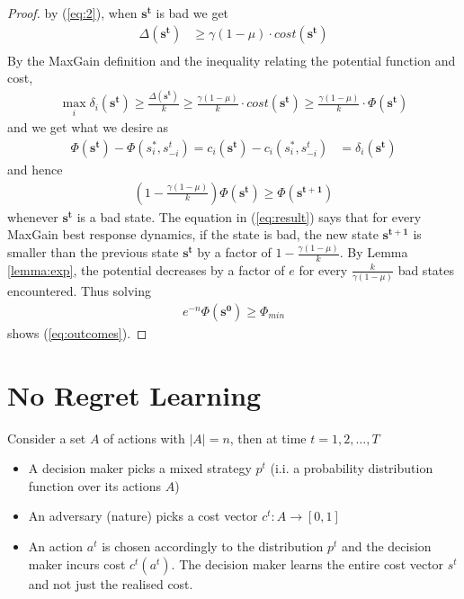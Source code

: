 \begin{thm}
\begin{proof}
by (\ref{eq:2}), when $\mathbf{s^t}$ is bad we get
\begin{align*}
\Delta(\mathbf{s^t})&\geq \gamma(1-\mu)\cdot cost(\mathbf{s^t})\\
\end{align*}
By the MaxGain definition and the inequality relating the potential function and cost,
\begin{align*}
\max_{i}\delta_i(\mathbf{s^t})\geq \frac{\Delta(\mathbf{s^t})}{k}\geq \frac{\gamma(1-\mu)}{k}\cdot cost(\mathbf{s^t})\geq \frac{\gamma(1-\mu)}{k}\cdot \Phi(\mathbf{s^t})
\end{align*}
and we get what we desire as
\begin{align*}
\Phi(\mathbf{s^t})-\Phi(s_i^\ast,s^t_{-i})
=c_i(\mathbf{s^t})-c_i(s_i^\ast,s^t_{-i})&=\delta_i(\mathbf{s^t})
\end{align*}
and hence
\begin{align}
\left(1-\frac{\gamma(1-\mu)}{k}\right)\Phi(\mathbf{s^t})\geq \Phi(\mathbf{s^{t+1}})\label{eq:result}
\end{align}
whenever $\mathbf{s^t}$ is a bad state. The equation in (\ref{eq:result}) says that for every MaxGain best response dynamics, if the state is bad, the new state $\mathbf{s^{t+1}}$ is smaller than the previous state $\mathbf{s^t}$ by a factor of $1-\frac{\gamma(1-\mu)}{k}$. By Lemma \ref{lemma:exp}, the potential decreases by a factor of $e$ for every $\frac{k}{\gamma(1-\mu)}$ bad states encountered. Thus solving 
\begin{align*}
e^{-n}\Phi(\mathbf{s^0}) \geq \Phi_{min}
\end{align*}
shows (\ref{eq:outcomes}).
\end{proof}
\end{thm}

\section{No Regret Learning}
Consider a set $A$ of actions with $|A|=n$, then at time $t=1,2,\ldots, T$
\begin{itemize}
\item A decision maker picks a mixed strategy $p^t$ (i.i. a probability distribution function over its actions $A$)
\item An adversary (nature) picks a cost vector $c^t:A\to [0,1]$
\item An action $a^t$ is chosen accordingly to the distribution $p^t$ and the decision maker incurs cost $c^t(a^t)$. The decision maker learns the entire cost vector $s^t$ and not just the realised cost.
\end{itemize}

